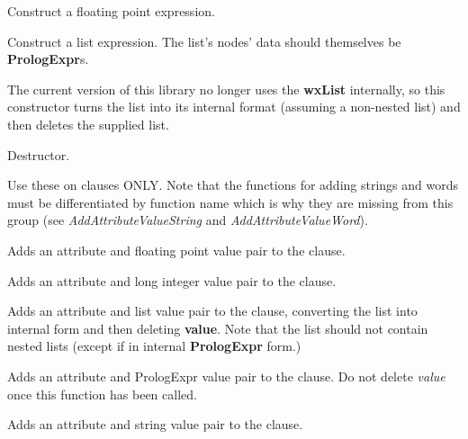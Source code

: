 Construct a floating point expression.


Construct a list expression. The list's nodes' data should
themselves be {\bf PrologExpr}s.

The current version of this library no longer uses the {\bf wxList}
internally, so this constructor turns the list into its internal
format (assuming a non-nested list) and then deletes the supplied
list.



Destructor.


Use these on clauses ONLY. Note that the functions for adding strings
and words must be differentiated by function name which is why
they are missing from this group (see {\it AddAttributeValueString} and
{\it AddAttributeValueWord}).


Adds an attribute and floating point value pair to the clause.


Adds an attribute and long integer value pair to the clause.


Adds an attribute and list value pair to the clause, converting the list into
internal form and then deleting {\bf value}. Note that the list should not contain
nested lists (except if in internal {\bf PrologExpr} form.)


Adds an attribute and PrologExpr value pair to the clause. Do not delete\rtfsp
{\it value} once this function has been called.



Adds an attribute and string value pair to the clause.


